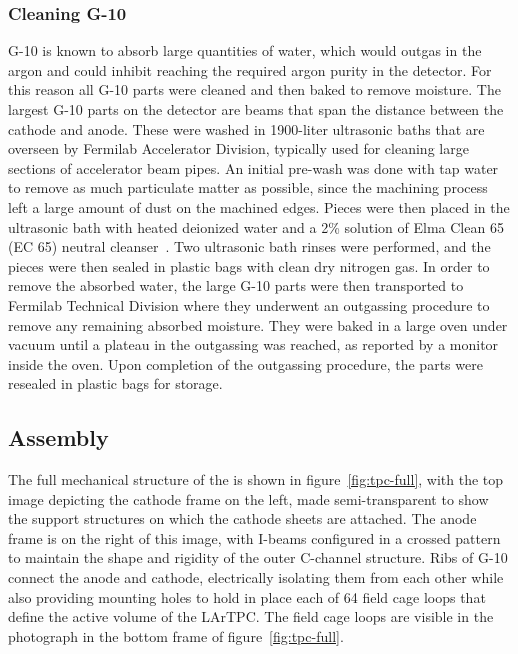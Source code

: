 \subsubsection{Cleaning G-10}

G-10 is known to absorb large quantities of water, which would outgas in the argon and could inhibit reaching the required argon purity in the detector. For this reason all G-10 parts were cleaned and then baked to remove moisture. The largest G-10 parts on the detector are beams that span the distance between the cathode and anode. These were washed in 1900-liter ultrasonic baths that are overseen by Fermilab Accelerator Division, typically used for cleaning large sections of accelerator beam pipes. An initial pre-wash was done with tap water to remove as much particulate matter as possible, since the machining process left a large amount of dust on the machined edges.  Pieces were then placed in the ultrasonic bath with heated deionized water and a 2\% solution of Elma Clean 65 (EC 65) neutral cleanser~\cite{elmaclean}. Two ultrasonic bath rinses were performed, and the pieces were then sealed in plastic bags with clean dry nitrogen gas. In order to remove the absorbed water, the large G-10 parts were then transported to Fermilab Technical Division where they underwent an outgassing procedure to remove any remaining absorbed moisture.  They were baked in a large oven under vacuum until a plateau in the outgassing was reached, as reported by a monitor inside the oven. Upon completion of the outgassing procedure, the parts were resealed in plastic bags for storage.

\subsection{Assembly}


The full mechanical structure of the \lartpc is shown in figure~\ref{fig:tpc-full}, with the top image depicting the cathode frame on the left, made semi-transparent to show the support structures on which the cathode sheets are attached. The anode frame is on the right of this image, with I-beams configured in a crossed pattern to maintain the shape and rigidity of the outer C-channel structure. Ribs of G-10 connect the anode and cathode, electrically isolating them from each other while also providing mounting holes to hold in place each of 64 field cage loops that define the active volume of the LArTPC.  The field cage loops are visible in the photograph in the bottom frame of figure~\ref{fig:tpc-full}.

